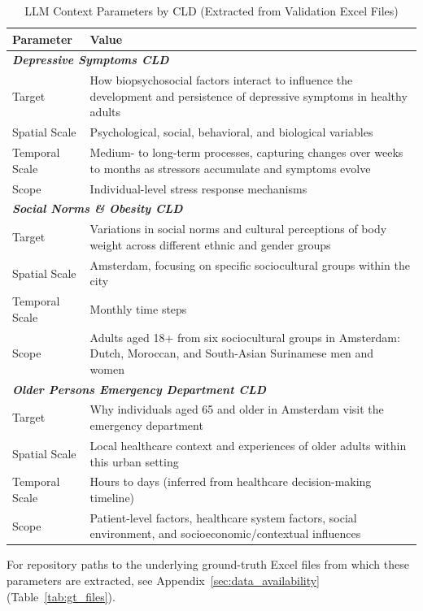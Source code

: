 \begin{table}[H]
\centering
\caption{LLM Context Parameters by CLD (Extracted from Validation Excel Files)}
\label{tab:cld_context}
\footnotesize
\begin{tabularx}{\textwidth}{@{}l X@{}}
\toprule
\textbf{Parameter} & \textbf{Value} \\
\midrule
\multicolumn{2}{l}{\textit{\textbf{Depressive Symptoms CLD}}} \\
Target & How biopsychosocial factors interact to influence the development and persistence of depressive symptoms in healthy adults \\
Spatial Scale & Psychological, social, behavioral, and biological variables \\
Temporal Scale & Medium- to long-term processes, capturing changes over weeks to months as stressors accumulate and symptoms evolve \\
Scope & Individual-level stress response mechanisms \\
\midrule
\multicolumn{2}{l}{\textit{\textbf{Social Norms \& Obesity CLD}}} \\
Target & Variations in social norms and cultural perceptions of body weight across different ethnic and gender groups \\
Spatial Scale & Amsterdam, focusing on specific sociocultural groups within the city \\
Temporal Scale & Monthly time steps \\
Scope & Adults aged 18+ from six sociocultural groups in Amsterdam: Dutch, Moroccan, and South-Asian Surinamese men and women \\
\midrule
\multicolumn{2}{l}{\textit{\textbf{Older Persons Emergency Department CLD}}} \\
Target & Why individuals aged 65 and older in Amsterdam visit the emergency department \\
Spatial Scale & Local healthcare context and experiences of older adults within this urban setting \\
Temporal Scale & Hours to days (inferred from healthcare decision-making timeline) \\
Scope & Patient-level factors, healthcare system factors, social environment, and socioeconomic/contextual influences \\
\bottomrule
\end{tabularx}
\end{table}
For repository paths to the underlying ground-truth Excel files from which these parameters are extracted, see Appendix~\ref{sec:data_availability} (Table~\ref{tab:gt_files}).


